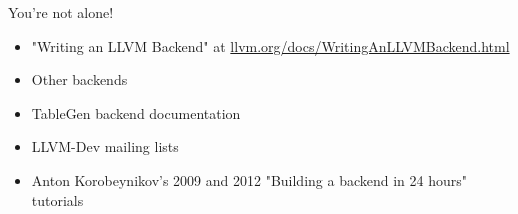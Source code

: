 
\begin{frame}{You're not alone!}

\begin{itemize}
    \item "Writing an LLVM Backend" at \url{llvm.org/docs/WritingAnLLVMBackend.html}
    \item Other backends 
    \item TableGen backend documentation
    \item LLVM-Dev mailing lists
    \item Anton Korobeynikov's 2009 and 2012 "Building a backend in 24 hours" tutorials
\end{itemize}

\end{frame}
